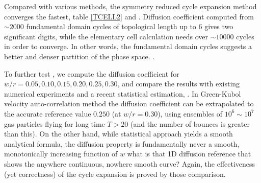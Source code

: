 Compared with various methods, the symmetry reduced cycle expansion
method converges the fastest, table \ref{TCELL2} and
. Diffusion coefficient computed from $\sim2000$
fundamental domain cycles of topological length up to 6 gives two
significant digits, while the elementary cell calculation needs over
$\sim 10000$ cycles in order to converge. In other words, the fundamental
domain cycles suggests a better and denser partition of the phase space.
    .

To further test , we compute the diffusion
coefficient for $w/r = 0.05, 0.10, 0.15, 0.20, 0.25, 0.30$, and compare
the results with existing numerical experiments and a recent statistical
estimation, . In Green-Kubol velocity
auto-correlation method the  diffusion coefficient can be extrapolated to
the accurate reference value $0.250$ (at $w/r=0.30$), using ensembles of
$10^6\sim10^7$ gas particles flying for long time $T>20$ (and the number
of bounces is greater than this). On the other hand, while
statistical approach yields a smooth analytical
formula, the diffusion property is fundamentally
never a smooth, monotonically increasing function of $w$
    {what is that 1D diffusion reference that shows the anywhere
    continuous, nowhere smooth curve?}
Again, the effectiveness (yet correctness) of the cycle expansion is
proved by those comparison.
